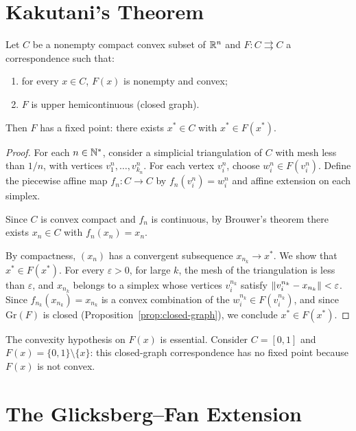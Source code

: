 \section{Kakutani's Theorem}

\begin{theorem}[Kakutani, 1941]
\label{thm:kakutani}
Let $C$ be a nonempty compact convex subset of $\mathbb{R}^n$ and
$F\colon C \rightrightarrows C$ a correspondence such that:
\begin{enumerate}
  \item for every $x \in C$, $F(x)$ is nonempty and convex;
  \item $F$ is upper hemicontinuous (closed graph).
\end{enumerate}
Then $F$ has a fixed point: there exists $x^* \in C$ with $x^* \in F(x^*)$.
\end{theorem}

\begin{proof}
For each $n \in \mathbb{N}^*$, consider a simplicial triangulation of $C$ with mesh less than
$1/n$, with vertices $v_1^n, \ldots, v_{k_n}^n$. For each vertex $v_i^n$, choose
$w_i^n \in F(v_i^n)$. Define the piecewise affine map $f_n\colon C \to C$ by
$f_n(v_i^n) = w_i^n$ and affine extension on each simplex.

Since $C$ is convex compact and $f_n$ is continuous, by Brouwer's theorem there exists
$x_n \in C$ with $f_n(x_n) = x_n$.

By compactness, $(x_n)$ has a convergent subsequence $x_{n_k} \to x^*$. We show that
$x^* \in F(x^*)$. For every $\varepsilon > 0$, for large $k$, the mesh of the
triangulation is less than $\varepsilon$, and $x_{n_k}$ belongs to a simplex whose
vertices $v_i^{n_k}$ satisfy $\left\| v_i^{n_k} - x_{n_k} \right\| < \varepsilon$. Since
$f_{n_k}(x_{n_k}) = x_{n_k}$ is a convex combination of the
$w_i^{n_k} \in F(v_i^{n_k})$, and since $\mathrm{Gr}(F)$ is closed
(Proposition~\ref{prop:closed-graph}), we conclude $x^* \in F(x^*)$.
\end{proof}

\begin{attention}
The convexity hypothesis on $F(x)$ is essential. Consider $C = [0,1]$ and
$F(x) = \{0, 1\} \setminus \{x\}$: this closed-graph correspondence has no fixed point
because $F(x)$ is not convex.
\end{attention}

\section{The Glicksberg--Fan Extension}

